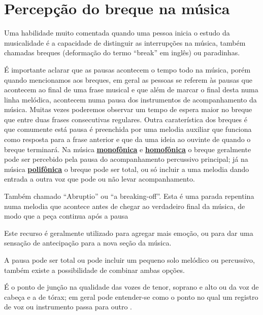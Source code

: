 \section{Percepção do breque na música}
\label{sec:percepcionbreak}

Uma habilidade muito comentada quando uma pessoa inicia o estudo da musicalidade 
é a capacidade de distinguir as interrupções na música, 
também chamadas breques (deformação do termo ``break'' em inglês) ou paradinhas.

É importante aclarar que as pausas acontecem o tempo todo na  música,
porém quando mencionamos aos breques, 
em geral as pessoas se referem às pausas que acontecem ao final de uma frase musical 
e que além de marcar o final desta numa linha melódica,
acontecem numa pausa dos instrumentos de acompanhamento da música.
Muitas vezes poderemos observar um tempo de espera maior no breque que entre duas frases consecutivas regulares.
Outra caraterística dos breques é que comumente está pausa é preenchida por uma melodia auxiliar 
que funciona como resposta para a frase anterior e que da uma ideia ao ouvinte de quando o breque terminará.
Na música \hyperref[subsec:monofonica]{\textbf{monofônica}} e \hyperref[subsec:homofonica]{\textbf{homofônica}} 
o breque geralmente pode ser percebido pela pausa do acompanhamento percussivo principal;
já na música \hyperref[subsec:polifonica]{\textbf{polifônica}} o breque pode ser total,
ou só incluir a uma melodia dando entrada a outra voz que pode ou não levar acompanhamento.
\begin{definition}[Breque]
\label{def:breakingoff}  
Também chamado ``Abruptio'' ou ``a breaking-off''. 
Esta é uma parada repentina numa melodia que acontece antes de chegar ao verdadeiro final da música, 
de modo que a peça continua após a pausa \cite[pp. 5]{baker1895dictionary}

Este recurso é geralmente utilizado para agregar mais emoção,
ou para dar uma sensação de antecipação para a nova seção da música. 

A pausa pode ser total ou pode incluir um pequeno solo melódico ou percussivo, 
também existe a possibilidade de combinar ambas opções.

\end{definition}

\begin{definition}[Break]
É o ponto de junção na qualidade das vozes de tenor, soprano e alto
ou da voz de cabeça e a de tórax;  
em geral pode entender-se como o ponto no qual um registro de voz ou instrumento passa para outro 
\cite[pp. 63]{stainer2009dictionary} \cite[pp. 31]{baker1895dictionary}.
\end{definition}

